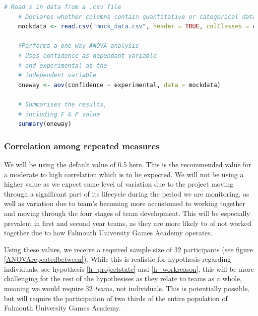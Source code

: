 \documentclass[journal]{IEEEtran}
\begin{document}
\begin{lstlisting}[language=R, caption = Sample R code for performing a one way ANOVA on data imported from a csv file, captionpos = b]
    # Read's in data from a .csv file
    # Declares whether columns contain quantitative or categorical data
    mockdata <- read.csv("mock_data.csv", header = TRUE, colClasses = c("factor", "factor", "numeric"))

    #Performs a one way ANOVA analysis
    # Uses confidence as dependant variable
    # and experimental as the
    # independent variable
    oneway <- aov(confidence ~ experimental, data = mockdata)

    # Summarises the results,
    # including F & P value
    summary(oneway)
\end{lstlisting}

\subsubsection*{Correlation among repeated measures}
We will be using the default value of 0.5 here. This is the recommended value for a moderate to high correlation\cite{gpowerguide} which is to be expected. We will not be using a higher value as we expect some level of variation due to the project moving through a significant part of its lifecycle during the period we are monitoring, as well as variation due to team's becoming more accustomed to working together and moving through the four stages of team development\cite{tuckman1965developmental}. This will be especially prevalent in first and second year teams, as they are more likely to of not worked together due to how Falmouth University Games Academy operates.

Using these values, we receive a required sample size of 32 participants (see figure \ref{ANOVArepeatedbetween}). While this is realistic for hypothesis regarding individuals, see hypothesis \ref{h_projectstate} and \ref{h_workreason}, this will be more challenging for the rest of the hypothesises as they relate to teams as a whole, meaning we would require 32 \textit{teams}, not individuals. This is potentially possible, but will require the participation of two thirds of the entire population of Falmouth University Games Academy.
\end{document}
